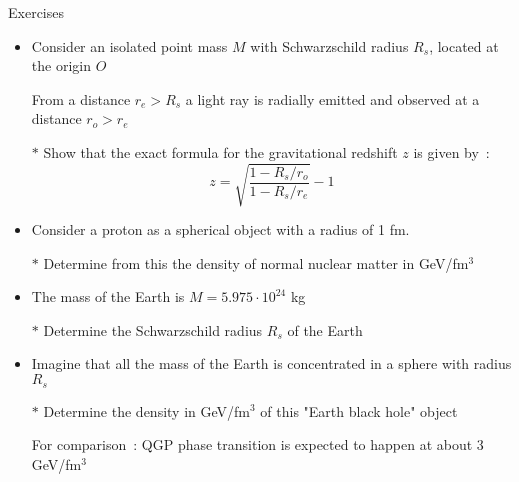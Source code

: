 \Tr
{\red
\begin{center}
Exercises
\end{center}
%
\begin{itemize}
\item Consider an isolated point mass $M$ with Schwarzschild radius $R_{s}$, located at the origin $O$
\item[] From a distance $r_{e}>R_{s}$ a light ray is radially emitted and observed at a distance $r_{o}>r_{e}$
\item[$\ast$] Show that the exact formula for the gravitational redshift $z$ is given by~:
              \begin{equation*}
              z=\sqrt{\frac{1-R_{s}/r_{o}}{1-R_{s}/r_{e}}}-1
              \end{equation*}
\item Consider a proton as a spherical object with a radius of 1 fm.
\item[$\ast$] Determine from this the density of normal nuclear matter in GeV/fm$^{3}$
\item The mass of the Earth is $M=5.975 \cdot 10^{24}$ kg
\item[$\ast$] Determine the Schwarzschild radius $R_{s}$ of the Earth
\item Imagine that all the mass of the Earth is concentrated in a sphere with radius $R_{s}$
\item[$\ast$] Determine the density in GeV/fm$^{3}$ of this "Earth black hole" object
\item[] For comparison~: QGP phase transition is expected to happen at about 3 GeV/fm$^{3}$
\end{itemize}
}